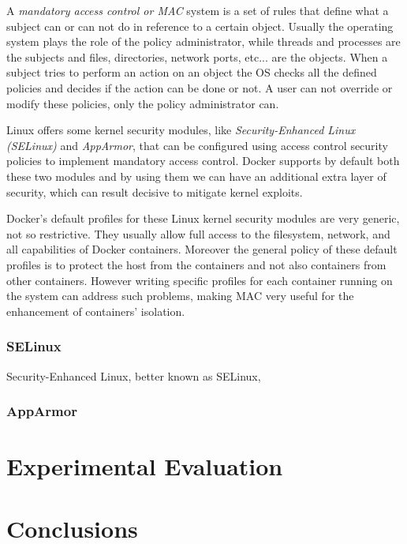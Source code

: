\documentclass[a4paper,12pt]{article}
\begin{document}
A \textit{mandatory access control or MAC} system is a set of rules that define
what a subject can or can not do in reference to a certain object. Usually the
operating system plays the role of the policy administrator, while threads and
processes are the subjects and files, directories, network ports, etc... are the
objects. When a subject tries to perform an action on an object the OS checks
all the defined policies and decides if the action can be done or not. A user
can not override or modify these policies, only the policy administrator
can\cite{wiki_MAC}. \par Linux offers some kernel security modules, like
\textit{Security-Enhanced Linux (SELinux)} and \textit{AppArmor}, that can be
configured using access control security policies to implement mandatory access
control. Docker supports by default both these two modules and by using them we
can have an additional extra layer of security, which can result decisive to
mitigate kernel exploits. \par Docker's default profiles for these Linux kernel
security modules are very generic, not so restrictive. They usually allow full
access to the filesystem, network, and all capabilities of Docker containers.
Moreover the general policy of these default profiles is to protect the host
from the containers and not also containers from other
containers\cite{to_docker_or_not_to_docker}. However writing specific profiles
for each container running on the system  can address such problems, making MAC
very useful for the enhancement of containers' isolation.

\subsubsection{SELinux}

Security-Enhanced Linux, better known as SELinux, 

\subsubsection{AppArmor}



\newpage

\section{Experimental Evaluation}

\newpage

\section{Conclusions}
\end{document}
